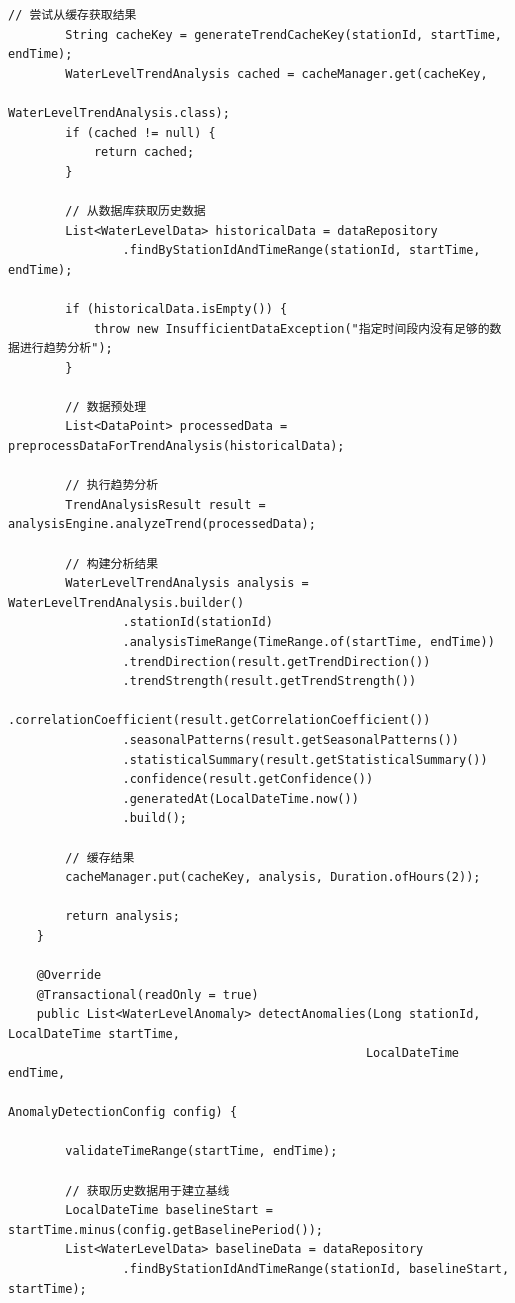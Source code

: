 \begin{lstlisting}[style=java]
        // 尝试从缓存获取结果
        String cacheKey = generateTrendCacheKey(stationId, startTime, endTime);
        WaterLevelTrendAnalysis cached = cacheManager.get(cacheKey, 
                                                         WaterLevelTrendAnalysis.class);
        if (cached != null) {
            return cached;
        }
        
        // 从数据库获取历史数据
        List<WaterLevelData> historicalData = dataRepository
                .findByStationIdAndTimeRange(stationId, startTime, endTime);
        
        if (historicalData.isEmpty()) {
            throw new InsufficientDataException("指定时间段内没有足够的数据进行趋势分析");
        }
        
        // 数据预处理
        List<DataPoint> processedData = preprocessDataForTrendAnalysis(historicalData);
        
        // 执行趋势分析
        TrendAnalysisResult result = analysisEngine.analyzeTrend(processedData);
        
        // 构建分析结果
        WaterLevelTrendAnalysis analysis = WaterLevelTrendAnalysis.builder()
                .stationId(stationId)
                .analysisTimeRange(TimeRange.of(startTime, endTime))
                .trendDirection(result.getTrendDirection())
                .trendStrength(result.getTrendStrength())
                .correlationCoefficient(result.getCorrelationCoefficient())
                .seasonalPatterns(result.getSeasonalPatterns())
                .statisticalSummary(result.getStatisticalSummary())
                .confidence(result.getConfidence())
                .generatedAt(LocalDateTime.now())
                .build();
        
        // 缓存结果
        cacheManager.put(cacheKey, analysis, Duration.ofHours(2));
        
        return analysis;
    }
    
    @Override
    @Transactional(readOnly = true)  
    public List<WaterLevelAnomaly> detectAnomalies(Long stationId, LocalDateTime startTime,
                                                  LocalDateTime endTime,
                                                  AnomalyDetectionConfig config) {
        
        validateTimeRange(startTime, endTime);
        
        // 获取历史数据用于建立基线
        LocalDateTime baselineStart = startTime.minus(config.getBaselinePeriod());
        List<WaterLevelData> baselineData = dataRepository
                .findByStationIdAndTimeRange(stationId, baselineStart, startTime);
                

\end{lstlisting}
